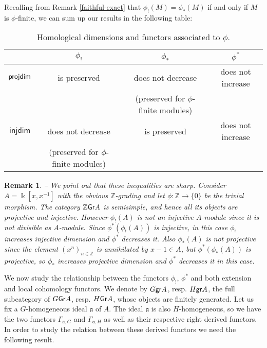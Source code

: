 \documentclass[twoside,11pt]{article}
\renewcommand{\k}{\Bbbk}
\newcommand{\Z}{{\mathbb Z}}
\renewcommand{\a}{{\mathfrak a}}
\newcommand{\GrMod}{{\sf Gr}}
\newcommand{\grmod}{{\sf gr}}
\newcommand{\pd}{{\sf projdim}}
\newcommand{\injdim}{\mathsf{injdim}}
\newtheorem{subremark}[subtheorem]{Remark}
\begin{document}
Recalling from Remark \ref{faithful-exact} that $\phi_!(M) = \phi_*(M)$ if and only if
$M$ is $\phi$-finite, we can sum up our results in the following table:
\begin{table*}[h]
\begin{centering}
\begin{tabular}{|c|c|c|c|}
\hline
{} 
	& $\phi_!$
	& $\phi_*$
	& $\phi^*$ \\
\hline
$\pd$
	& is preserved
	& does not decrease 
	& does not increase \\
{}
	& {}
	& (preserved for $\phi$-finite modules)
	& {} \\\hline
$\injdim$
	& does not decrease
	& is preserved
	& does not increase \\
{}
	& (preserved for $\phi$-finite modules)
	& {} 
	& {}\\
\hline
\end{tabular} 
\end{centering}
\label{phi-finite}
\caption{Homological dimensions and functors associated to $\phi$.}
\end{table*}

\begin{subremark} -- \label{rmk-cebr} \rm
We point out that these inequalities are sharp. Consider $A = \k[x,x^{-1}]$ with the
obvious $\Z$-grading and let $\phi: \Z \to \{0\}$ be the trivial morphism. The category
$\Z \GrMod A$ is semisimple, and hence all its objects are projective and injective.
However $\phi_!(A)$ is not an injective $A$-module since it is not divisible as
$A$-module. Since $\phi^*(\phi_!(A))$ is injective, in this case $\phi_!$ increases
injective dimension and $\phi^*$ decreases it. Also $\phi_*(A)$ is not projective since
the element $(x^n)_{n \in \Z}$ is annihilated by $x-1 \in A$, but $\phi^*(\phi_*(A))$ is
projective, so $\phi_*$ increases projective dimension and $\phi^*$ decreases it in this
case.
\end{subremark}

We now study the relationship between the functors $\phi_!$, $\phi^*$ and both extension
and local cohomology functors. We denote by $G\grmod A$, resp. $H\grmod A$, the full
subcategory of $G\GrMod A $, resp. $H\GrMod A $, whose objects are finitely generated. 
Let us fix a $G$-homogeneous ideal $\a$ of $A$. The ideal $\a$ is also $H$-homogeneous, so
we have the two functors $\Gamma_{\a,G}$ and $\Gamma_{\a,H}$ as well as their respective
right derived functors. In order to study the relation between these derived functors we
need the following result.
\end{document}
